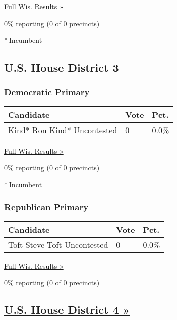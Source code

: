 \href{https://www.nytimes3xbfgragh.onion/elections/results/wisconsin}{Full
Wis. Results »}

0\% reporting (0 of 0 precincts)

* Incumbent

\hypertarget{us-house-district-3}{%
\subsection{U.S. House District 3}\label{us-house-district-3}}

\hypertarget{democratic-primary-4}{%
\subsubsection{Democratic Primary}\label{democratic-primary-4}}

\begin{longtable}[]{@{}lll@{}}
\toprule
Candidate & Vote & Pct.\tabularnewline
\midrule
\endhead
 Kind* Ron Kind* Uncontested & 0 & 0.0\%\tabularnewline
\bottomrule
\end{longtable}

\href{https://www.nytimes3xbfgragh.onion/elections/results/wisconsin}{Full
Wis. Results »}

0\% reporting (0 of 0 precincts)

* Incumbent

\hypertarget{republican-primary-3}{%
\subsubsection{Republican Primary}\label{republican-primary-3}}

\begin{longtable}[]{@{}lll@{}}
\toprule
Candidate & Vote & Pct.\tabularnewline
\midrule
\endhead
 Toft Steve Toft Uncontested & 0 & 0.0\%\tabularnewline
\bottomrule
\end{longtable}

\href{https://www.nytimes3xbfgragh.onion/elections/results/wisconsin}{Full
Wis. Results »}

0\% reporting (0 of 0 precincts)

\hypertarget{us-house-district-4-}{%
\subsection{\texorpdfstring{\href{https://www.nytimes3xbfgragh.onion/elections/results/wisconsin-house-district-4-primary-election}{U.S.
House District 4
»}}{U.S. House District 4 »}}\label{us-house-district-4-}}

